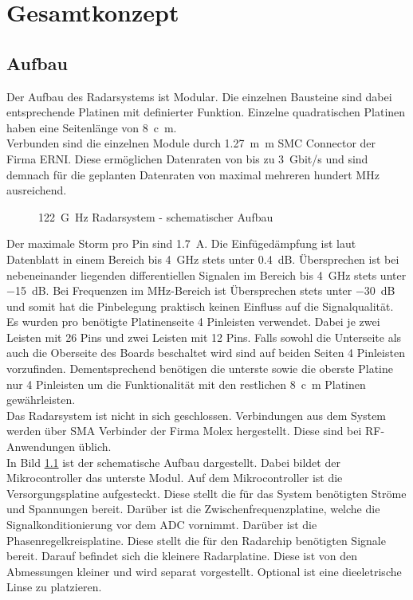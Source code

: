 \chapter{Gesamtkonzept}
\section{Aufbau}
Der Aufbau des Radarsystems ist Modular. Die einzelnen Bausteine sind dabei entsprechende Platinen mit definierter Funktion. Einzelne quadratischen Platinen haben eine Seitenlänge von \SI{8}{c\metre}.\\
 Verbunden sind die einzelnen Module durch \SI{1.27}{m\metre} SMC Connector der Firma ERNI. Diese ermöglichen Datenraten von bis zu \SI{3}{Gbit/s} und sind demnach für die geplanten Datenraten von maximal mehreren hundert MHz ausreichend. 
\begin{figure}[tbp]
  \centering
  
  \caption{\SI{122}{G\hertz} Radarsystem - schematischer Aufbau}
  \label{fig:Gesamtkonzept_Grob}
\end{figure} 
Der maximale Storm pro Pin sind \SI{1.7}{\ampere}. Die Einfügedämpfung ist laut Datenblatt in einem Bereich bis \SI{4}{\giga\hertz} stets unter \SI{0.4}{dB}. Übersprechen ist  bei nebeneinander liegenden differentiellen Signalen im Bereich bis \SI{4}{\giga\hertz} stets unter \SI{-15}{dB}. Bei Frequenzen im MHz-Bereich ist Übersprechen stets unter \SI{-30}{dB} und somit hat die Pinbelegung praktisch keinen Einfluss auf die Signalqualität. 
Es wurden pro benötigte Platinenseite 4 Pinleisten verwendet. Dabei je zwei Leisten mit 26 Pins und zwei Leisten mit 12 Pins. Falls sowohl die Unterseite als auch die Oberseite des Boards beschaltet wird sind auf beiden Seiten 4 Pinleisten vorzufinden. Dementsprechend benötigen die unterste sowie die oberste Platine nur 4 Pinleisten um die Funktionalität mit den restlichen \SI{8}{c\metre} Platinen gewährleisten.\\
Das Radarsystem ist nicht in sich geschlossen. Verbindungen aus dem System werden über SMA Verbinder der Firma Molex hergestellt. Diese sind bei RF-Anwendungen üblich. \\
In Bild \ref{fig:Gesamtkonzept_Grob} ist der schematische Aufbau dargestellt. Dabei bildet der Mikrocontroller das unterste Modul. Auf dem Mikrocontroller ist die Versorgungsplatine aufgesteckt. Diese stellt die für das System benötigten Ströme und Spannungen bereit. Darüber ist die Zwischenfrequenzplatine, welche die Signalkonditionierung vor dem ADC vornimmt. Darüber ist die Phasenregelkreisplatine. Diese stellt die für den Radarchip benötigten Signale bereit. Darauf befindet sich die kleinere Radarplatine. Diese ist von den Abmessungen kleiner und wird separat vorgestellt. Optional ist eine dieeletrische Linse zu platzieren. \\
